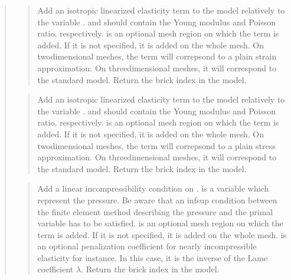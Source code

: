 \documentclass[a4paper,11pt,english]{sphinxmanual}
\begin{document}
\begin{quote}
\begin{quote}
Add an isotropic linearized elasticity term to the model relatively to
the variable .  and  should
contain the Young modulus and Poisson ratio, respectively.
 is an optional mesh region on which the term is added.
If it is not specified, it is added
on the whole mesh.
On two\sphinxhyphen{}dimensional meshes, the term will correpsond to a plain strain
approximation. On three\sphinxhyphen{}dimensional meshes, it will correspond to the
standard model.
Return the brick index in the model.
\end{quote}

\begin{quote}

Add an isotropic linearized elasticity term to the model relatively to
the variable .  and  should
contain the Young modulus and Poisson ratio, respectively.
 is an optional mesh region on which the term is added.
If it is not specified, it is added
on the whole mesh.
On two\sphinxhyphen{}dimensional meshes, the term will correpsond to a plain stress
approximation. On three\sphinxhyphen{}dimensional meshes, it will correspond to the
standard model.
Return the brick index in the model.
\end{quote}

\begin{quote}

Add a linear incompressibility condition on . 
is a variable which represent the pressure. Be aware that an inf\sphinxhyphen{}sup
condition between the finite element method describing the pressure and the
primal variable has to be satisfied.  is an optional mesh region on
which the term is added. If it is not specified, it is added on the whole
mesh.  is an optional penalization coefficient for nearly
incompressible elasticity for instance. In this case, it is the inverse
of the Lame coefficient \(\lambda\). Return the brick index in the
model.
\end{quote}


\end{quote}
\end{document}
